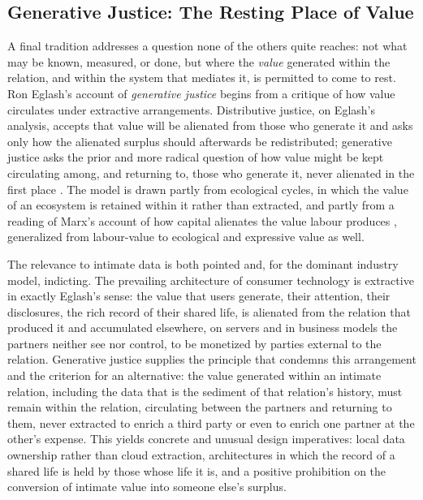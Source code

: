\documentclass[11pt,a4paper]{article}
\begin{document}
\subsection{Generative Justice: The Resting Place of Value}\label{p01:sec:generative}

A final tradition addresses a question none of the others quite reaches: not what may be known, measured, or done, but where the \emph{value} generated within the relation, and within the system that mediates it, is permitted to come to rest. Ron Eglash's account of \emph{generative justice} begins from a critique of how value circulates under extractive arrangements. Distributive justice, on Eglash's analysis, accepts that value will be alienated from those who generate it and asks only how the alienated surplus should afterwards be redistributed; generative justice asks the prior and more radical question of how value might be kept circulating among, and returning to, those who generate it, never alienated in the first place \parencite{eglash2016generative}. The model is drawn partly from ecological cycles, in which the value of an ecosystem is retained within it rather than extracted, and partly from a reading of Marx's account of how capital alienates the value labour produces \parencite{marx1867capital}, generalized from labour-value to ecological and expressive value as well.

The relevance to intimate data is both pointed and, for the dominant industry model, indicting. The prevailing architecture of consumer technology is extractive in exactly Eglash's sense: the value that users generate, their attention, their disclosures, the rich record of their shared life, is alienated from the relation that produced it and accumulated elsewhere, on servers and in business models the partners neither see nor control, to be monetized by parties external to the relation. Generative justice supplies the principle that condemns this arrangement and the criterion for an alternative: the value generated within an intimate relation, including the data that is the sediment of that relation's history, must remain within the relation, circulating between the partners and returning to them, never extracted to enrich a third party or even to enrich one partner at the other's expense. This yields concrete and unusual design imperatives: local data ownership rather than cloud extraction, architectures in which the record of a shared life is held by those whose life it is, and a positive prohibition on the conversion of intimate value into someone else's surplus.
\end{document}
